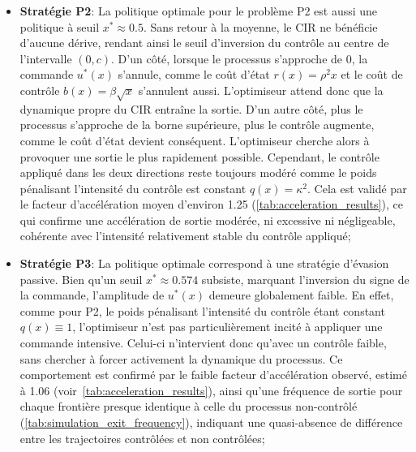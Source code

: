 \begin{itemize}
    \item \textbf{Stratégie P2}: La politique optimale pour le problème P2 est aussi une politique à seuil $x^*\approx0.5$. Sans retour à la moyenne, le \acs{CIR} ne bénéficie d'aucune dérive, rendant ainsi le seuil d'inversion du contrôle au centre de l'intervalle \((0,c)\). D'un côté, lorsque le processus s'approche de 0, la commande \(u^*(x)\) s'annule, comme le coût d'état \(r(x)=\rho^2x\) et le coût de contrôle \(b(x)=\beta\sqrt{x}\) s'annulent aussi. L'optimiseur attend donc que la dynamique propre du \acs{CIR} entraîne la sortie. D'un autre côté, plus le processus s'approche de la borne supérieure, plus le contrôle augmente, comme le coût d'état devient conséquent. L'optimiseur cherche alors à provoquer une sortie le plus rapidement possible. Cependant, le contrôle appliqué dans les deux directions reste toujours modéré comme le poids pénalisant l'intensité du contrôle est constant \(q(x)=\kappa^2\). Cela est validé par le facteur d'accélération moyen d'environ 1.25 (\ref{tab:acceleration_results}), ce qui confirme une accélération de sortie modérée, ni excessive ni négligeable, cohérente avec l'intensité relativement stable du contrôle appliqué;
    \item \textbf{Stratégie P3}: La politique optimale correspond à une stratégie d'évasion passive. Bien qu'un seuil \(x^*\approx0.574\) subsiste, marquant l'inversion du signe de la commande, l'amplitude de \(u^*(x)\) demeure globalement faible. En effet, comme pour P2,  le poids pénalisant l'intensité du contrôle étant constant \(q(x) \equiv 1\), l'optimiseur n'est pas particulièrement incité à appliquer une commande intensive. Celui-ci n'intervient donc qu'avec un contrôle faible, sans chercher à forcer activement la dynamique du processus. Ce comportement est confirmé par le faible facteur d'accélération observé, estimé à 1.06 (voir~\ref{tab:acceleration_results}), ainsi qu'une fréquence de sortie pour chaque frontière presque identique à celle du processus non-contrôlé (\ref{tab:simulation_exit_frequency}), indiquant une quasi-absence de différence entre les trajectoires contrôlées et non contrôlées;

\end{itemize}
